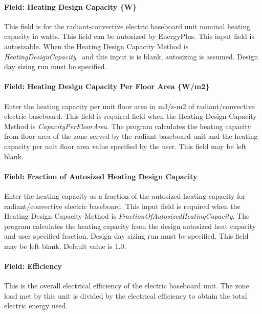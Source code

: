\paragraph{Field: Heating Design Capacity \{W\}}\label{field-heating-design-capacity-w-2}

This field is for the radiant-convective electric baseboard unit nominal heating capacity in watts. This field can be autosized by EnergyPlus. This input field is autosizable. When the Heating Design Capacity Method is \emph{HeatingDesignCapacity}~ and this input is is blank, autosizing is assumed. Design day sizing run must be specified.

\paragraph{Field: Heating Design Capacity Per Floor Area \{W/m2\}}\label{field-heating-design-capacity-per-floor-area-wm2-2}

Enter the heating capacity per unit floor area in m3/s-m2 of radiant/convective electric baseboard. This field is required field when the Heating Design Capacity Method is \emph{CapacityPerFloorArea}. The program calculates the heating capacity from floor area of the zone served by the radiant baseboard unit and the heating capacity per unit floor area value specified by the user. This field may be left blank.

\paragraph{Field: Fraction of Autosized Heating Design Capacity}\label{field-fraction-of-autosized-heating-design-capacity-2}

Enter the heating capacity as a fraction of the autosized heating capacity for radiant/convective electric baseboard. This input field is required when the Heating Design Capacity Method is \emph{FractionOfAutosizedHeatingCapacity}. The program calculates the heating capacity from the design autosized heat capacity and user specified fraction. Design day sizing run must be specified. This field may be left blank. Default value is 1.0.

\paragraph{Field: Efficiency}\label{field-efficiency-001}

This is the overall electrical efficiency of the electric baseboard unit. The zone load met by this unit is divided by the electrical efficiency to obtain the total electric energy used.

